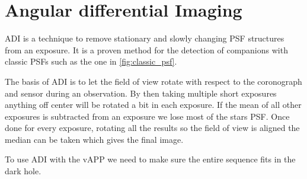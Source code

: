 
\section{Angular differential Imaging}
\ac{ADI} is a technique to remove stationary and slowly changing PSF structures from an exposure. It is a proven method for the detection of companions with classic \acp{PSF} such as the one in \autoref{fig:classic_psf}. %

The basis of \ac{ADI} is to let the field of view rotate with respect to the coronograph and sensor during an observation. By then taking multiple short exposures anything off center will be rotated a bit in each exposure. If the mean of all other exposures is subtracted from an exposure we lose most of the stars \ac{PSF}. Once done for every exposure, rotating all the results so the field of view is aligned the median can be taken which gives the final image.

To use \ac{ADI} with the \ac{vAPP} we need to make sure the entire sequence fits in the dark hole.
